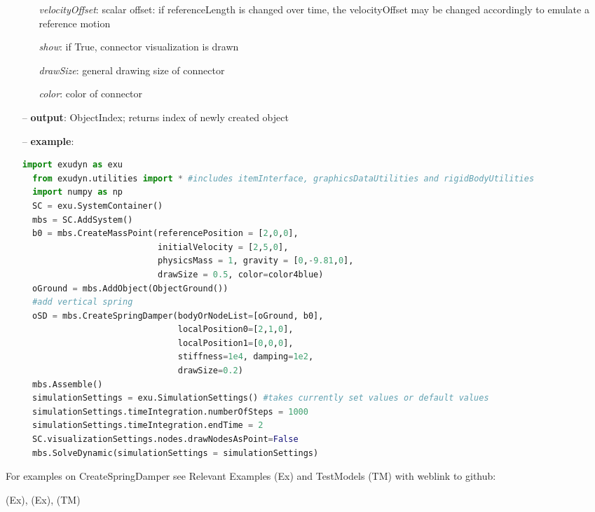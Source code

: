 \begin{itemize}[leftmargin=0.7cm]
\begin{itemize}[leftmargin=1.2cm]
\item[]{\it velocityOffset}: scalar offset: if referenceLength is changed over time, the velocityOffset may be changed accordingly to emulate a reference motion
\item[]{\it show}: if True, connector visualization is drawn
\item[]{\it drawSize}: general drawing size of connector
\item[]{\it color}: color of connector
\end{itemize}
\item[--]
{\bf output}: ObjectIndex; returns index of newly created object
\item[--]
{\bf example}: \vspace{-12pt}\ei\begin{lstlisting}[language=Python, xleftmargin=36pt]
  import exudyn as exu
  from exudyn.utilities import * #includes itemInterface, graphicsDataUtilities and rigidBodyUtilities
  import numpy as np
  SC = exu.SystemContainer()
  mbs = SC.AddSystem()
  b0 = mbs.CreateMassPoint(referencePosition = [2,0,0],
                           initialVelocity = [2,5,0],
                           physicsMass = 1, gravity = [0,-9.81,0],
                           drawSize = 0.5, color=color4blue)
  oGround = mbs.AddObject(ObjectGround())
  #add vertical spring
  oSD = mbs.CreateSpringDamper(bodyOrNodeList=[oGround, b0],
                               localPosition0=[2,1,0],
                               localPosition1=[0,0,0],
                               stiffness=1e4, damping=1e2,
                               drawSize=0.2)
  mbs.Assemble()
  simulationSettings = exu.SimulationSettings() #takes currently set values or default values
  simulationSettings.timeIntegration.numberOfSteps = 1000
  simulationSettings.timeIntegration.endTime = 2
  SC.visualizationSettings.nodes.drawNodesAsPoint=False
  mbs.SolveDynamic(simulationSettings = simulationSettings)
\end{lstlisting}\vspace{-24pt}\bi\item[]\vspace{-24pt}\vspace{12pt}\end{itemize}
%

%
\noindent For examples on CreateSpringDamper see Relevant Examples (Ex) and TestModels (TM) with weblink to github:
\bi
 \item \footnotesize {} (Ex), 
 (Ex), 
 (TM)
\ei


